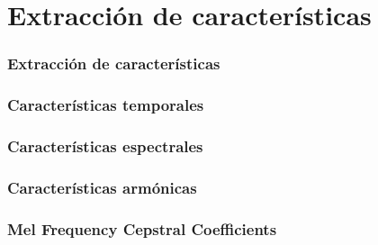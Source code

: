 \section{Extracción de características}\label{sec:features}

\begin{frame}
    \frametitle{Extracción de características}

\end{frame}

\begin{frame}
    \frametitle{Características temporales}

\end{frame}

\begin{frame}
    \frametitle{Características espectrales}

\end{frame}

\begin{frame}
    \frametitle{Características armónicas}

\end{frame}

\begin{frame}
    \frametitle{Mel Frequency Cepstral Coefficients}

\end{frame}
